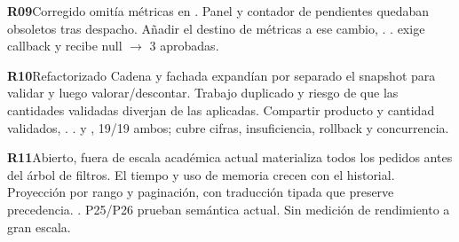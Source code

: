 \par\medskip\noindent\begin{minipage}{\linewidth}\noindent\textbf{R09}\quad\textsf{Corregido}
  omitía métricas en .
 Panel y contador de pendientes quedaban obsoletos tras despacho.
 Añadir el destino de métricas a ese cambio, .
 . 
  exige callback y recibe null $\to$  3 aprobadas.
\end{minipage}\par
\par\medskip\noindent\begin{minipage}{\linewidth}\noindent\textbf{R10}\quad\textsf{Refactorizado}
 Cadena y fachada expandían por separado el snapshot para validar y luego valorar/descontar.
 Trabajo duplicado y riesgo de que las cantidades validadas diverjan de las aplicadas.
 Compartir producto y cantidad validados, .
 . 
  y , 19/19 ambos; cubre cifras, insuficiencia, rollback y concurrencia.
\end{minipage}\par
\par\medskip\noindent\begin{minipage}{\linewidth}\noindent\textbf{R11}\quad\textsf{Abierto, fuera de escala académica actual}
  materializa todos los pedidos antes del árbol de filtros.
 El tiempo y uso de memoria crecen con el historial.
 Proyección por rango y paginación, con traducción tipada que preserve precedencia.
 . 
 P25/P26 prueban semántica actual. Sin medición de rendimiento a gran escala.
\end{minipage}\par
